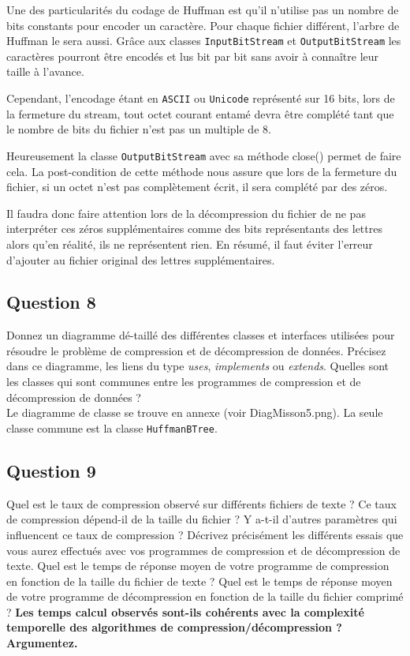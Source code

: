 \documentclass[11pt]{article}
\begin{document}
Une des particularités du codage de Huffman est qu'il n'utilise pas un nombre de bits constants pour encoder un caractère. Pour chaque fichier différent, l'arbre de Huffman le sera aussi. Grâce aux classes \verb+InputBitStream+ et \verb+OutputBitStream+ les caractères pourront être encodés et lus bit par bit sans avoir à connaître leur taille à l'avance.

Cependant, l'encodage étant en \verb+ASCII+ ou \verb+Unicode+ représenté sur 16 bits, lors de la fermeture du stream, tout octet courant entamé devra être complété tant que le nombre de bits du fichier n'est pas un multiple de 8.

Heureusement la classe \verb+OutputBitStream+ avec sa méthode close() permet de faire cela. La post-condition de cette méthode nous assure que lors de la fermeture du fichier, si un octet n'est pas complètement écrit, il sera complété par des zéros.

Il faudra donc faire attention lors de la décompression du fichier de ne pas interpréter ces zéros supplémentaires comme des bits représentants des lettres alors qu'en réalité, ils ne représentent rien. En résumé, il faut éviter l'erreur d'ajouter au fichier original des lettres supplémentaires.

\subsection*{Question 8}
Donnez un diagramme dé-taillé des différentes classes et interfaces utilisées pour résoudre le problème de compression et de décompression de données. Précisez dans ce diagramme, les liens du type \textit{uses}, \textit{implements} ou \textit{extends}. Quelles sont les classes qui sont communes entre les programmes de compression et de décompression de données ? \\

Le diagramme de classe se trouve en annexe (voir DiagMisson5.png). La seule classe commune est la classe \verb+HuffmanBTree+.


\subsection*{Question 9}
Quel est le taux de compression observé sur différents fichiers de texte ? Ce taux de compression dépend-il de la taille du fichier ? Y a-t-il d'autres paramètres qui influencent ce taux de compression ? Décrivez précisément les différents essais que vous aurez effectués avec vos programmes de compression et de décompression de texte. Quel est le temps de réponse moyen de votre programme de compression en fonction de la taille du fichier de texte ? Quel est le temps de réponse moyen de votre programme de décompression en fonction de la taille du fichier comprimé ? \textbf{Les temps calcul observés sont-ils cohérents avec la complexité temporelle des algorithmes de compression/décompression ? Argumentez.} \\
\end{document}
